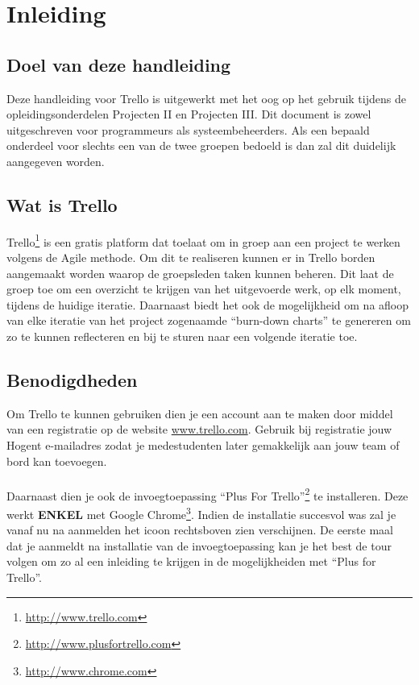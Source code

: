 \chapter{Inleiding}

\section{Doel van deze handleiding}

Deze handleiding voor Trello is uitgewerkt met het oog op het gebruik tijdens de opleidingsonderdelen Projecten II en Projecten III. Dit document is zowel uitgeschreven voor programmeurs als systeembeheerders. Als een bepaald onderdeel voor slechts een van de twee groepen bedoeld is dan zal dit duidelijk aangegeven worden.

\section{Wat is Trello}

Trello\footnote{\url{http://www.trello.com}} is een gratis platform dat toelaat om in groep aan een project te werken volgens de Agile methode. Om dit te realiseren kunnen er in Trello borden aangemaakt worden waarop de groepsleden taken kunnen beheren. Dit laat de groep toe om een overzicht te krijgen van het uitgevoerde werk, op elk moment, tijdens de huidige iteratie. Daarnaast biedt het ook de mogelijkheid om na afloop van elke iteratie van het project zogenaamde ``burn-down charts'' te genereren om zo te kunnen reflecteren en bij te sturen naar een volgende iteratie toe.

\section{Benodigdheden}

Om Trello te kunnen gebruiken dien je een account aan te maken door middel van een registratie op de website \url{www.trello.com}. Gebruik bij registratie jouw Hogent e-mailadres zodat je medestudenten later gemakkelijk aan jouw team of bord kan toevoegen.\\

\noindent
\\Daarnaast dien je ook de invoegtoepassing ``Plus For Trello''\footnote{\url{http://www.plusfortrello.com}} te installeren. Deze werkt \textbf{ENKEL} met Google Chrome\footnote{\url{http://www.chrome.com}}. Indien de installatie succesvol was zal je vanaf nu na aanmelden het icoon  rechtsboven zien verschijnen. De eerste maal dat je aanmeldt na installatie van de invoegtoepassing kan je het best de tour volgen om zo al een inleiding te krijgen in de mogelijkheiden met ``Plus for Trello''.

